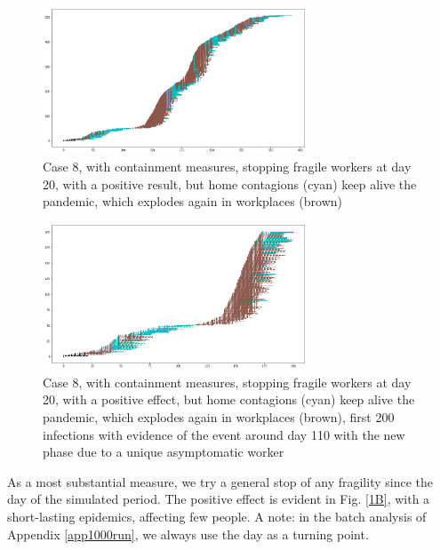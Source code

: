 \documentclass[11pt]{article}
\begin{document}
\begin{figure}[H]
\begin{center}
\includegraphics[width=0.7\textwidth]{withShort1A.png}%
\caption{Case 8, with containment measures, stopping fragile workers at day 20, with a positive result, but home contagions (cyan) keep alive the pandemic, which explodes again in workplaces (brown)}
\label{1A}
\end{center}
\end{figure}

\begin{figure}[H]
\begin{center}
\includegraphics[width=0.7\textwidth]{withShort1A200.png}%
\caption{Case 8, with containment measures, stopping fragile workers at day 20, with a positive effect, but home contagions (cyan) keep alive the pandemic, which explodes again in workplaces (brown), first 200 infections with evidence of the event around day 110 with the new phase due to a unique asymptomatic worker}
\label{1A200}
\end{center}
\end{figure}

As a most substantial measure, we try a general stop of any fragility since the  day of the simulated period. The positive effect is evident in Fig. \ref{1B}, with a short-lasting epidemics, affecting few people. A note: in the batch analysis of Appendix \ref{app1000run}, we always use the  day as a turning point.
\end{document}
